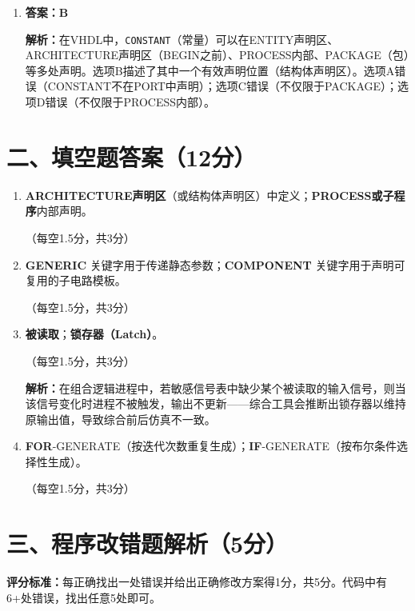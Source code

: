 \begin{enumerate}[label=\arabic*.]
\item \textbf{答案：B}

\textbf{解析：}在VHDL中，\texttt{CONSTANT}（常量）可以在ENTITY声明区、ARCHITECTURE声明区（BEGIN之前）、PROCESS内部、PACKAGE（包）等多处声明。选项B描述了其中一个有效声明位置（结构体声明区）。选项A错误（CONSTANT不在PORT中声明）；选项C错误（不仅限于PACKAGE）；选项D错误（不仅限于PROCESS内部）。

\end{enumerate}

\section{二、填空题答案（12分）}

\begin{enumerate}[label=\arabic*.]

\item \textbf{ARCHITECTURE声明区}（或结构体声明区）中定义；\textbf{PROCESS或子程序}内部声明。

（每空1.5分，共3分）

\item \textbf{GENERIC} 关键字用于传递静态参数；\textbf{COMPONENT} 关键字用于声明可复用的子电路模板。

（每空1.5分，共3分）

\item \textbf{被读取}；\textbf{锁存器（Latch）}。

（每空1.5分，共3分）

\textbf{解析：}在组合逻辑进程中，若敏感信号表中缺少某个被读取的输入信号，则当该信号变化时进程不被触发，输出不更新——综合工具会推断出锁存器以维持原输出值，导致综合前后仿真不一致。

\item \textbf{FOR}-GENERATE（按迭代次数重复生成）；\textbf{IF}-GENERATE（按布尔条件选择性生成）。

（每空1.5分，共3分）

\end{enumerate}

\section{三、程序改错题解析（5分）}

\begin{framed}
\textbf{评分标准：}每正确找出一处错误并给出正确修改方案得1分，共5分。代码中有6+处错误，找出任意5处即可。
\end{framed}

